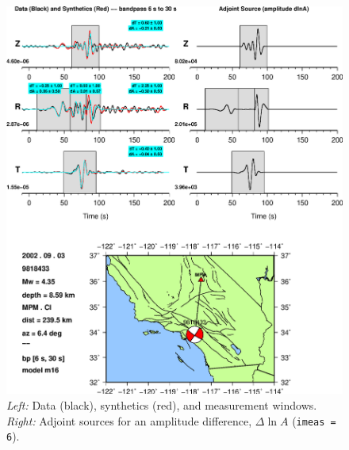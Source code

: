 \documentclass[11pt,titlepage,fleqn]{article}
\begin{document}
\begin{figure}
\includegraphics[width=17cm]{9818433_T006_T030_MPM_CI_m16_iker06_win_adj.eps}
\caption[]
{{
{\em Left:} Data (black), synthetics (red), and measurement windows.
{\em Right:} Adjoint sources for an amplitude difference, $\Delta \ln A$ ({\tt imeas = 6}).
\label{fig:iker06}
}}
\end{figure}
\end{document}
